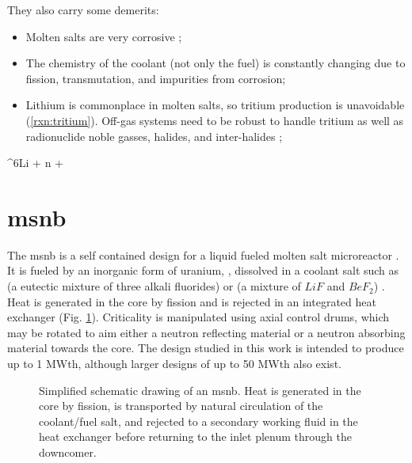 They also carry some demerits:
\begin{itemize}
    \item Molten salts are very corrosive \cite{RoperRedox};
    \item The chemistry of the coolant (not only the fuel) is constantly changing due to fission, transmutation, and impurities from corrosion;
    \item Lithium is commonplace in molten salts, so tritium production is unavoidable (\ref{rxn:tritium}). Off-gas systems need to be robust to handle tritium as well as radionuclide noble gasses, halides, and inter-halides \cite{HolcombOffgas};
\end{itemize}

\begin{reaction} \label{rxn:tritium}
    ^{6}Li + n  + \alpha
\end{reaction}

\section{\texorpdfstring{\acl{msnb}}{Molten Salt Nuclear Battery}}
The \acf{msnb} is a self contained design for a liquid fueled molten salt microreactor \cite{CarterPHD,PetersonMS}. It is fueled by an inorganic form of uranium, \UF, dissolved in a coolant salt such as \flinak (a eutectic mixture of three alkali fluorides) or \flibe  (a mixture of $LiF$ and $BeF_2$) \cite{RoperOverview}. Heat is generated in the core by fission and is rejected in an integrated heat exchanger (Fig. \ref{fig:tikz_msnb}). Criticality is manipulated using axial control drums, which may be rotated to aim either a neutron reflecting material or a neutron absorbing material towards the core. The design studied in this work is intended to produce up to 1 MWth, although larger designs of up to 50 MWth also exist.

\begin{figure}[!ht]
    \centering
    
    \caption[Simplified schematic drawing of an \acs{msnb}]{Simplified schematic drawing of an \acs{msnb}. Heat is generated in the core by fission, is transported by natural circulation of the coolant/fuel salt, and rejected to a secondary working fluid in the heat exchanger before returning to the inlet plenum through the downcomer.}
    \label{fig:tikz_msnb}
\end{figure}

